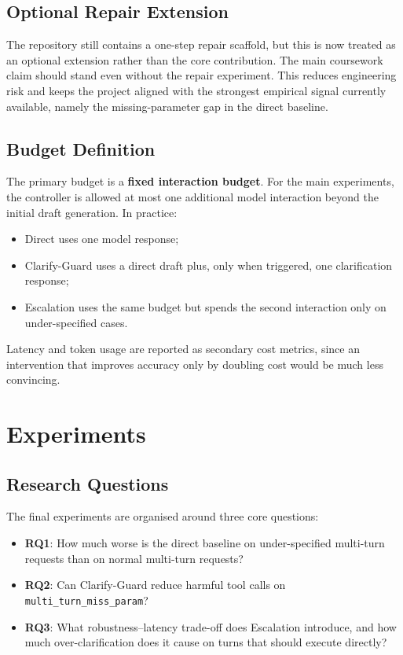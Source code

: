 \documentclass[10pt,twocolumn]{article}
\begin{document}
\subsection{Optional Repair Extension}
The repository still contains a one-step repair scaffold, but this is now treated as an optional extension rather than the core contribution. The main coursework claim should stand even without the repair experiment. This reduces engineering risk and keeps the project aligned with the strongest empirical signal currently available, namely the missing-parameter gap in the direct baseline.

\subsection{Budget Definition}
The primary budget is a \textbf{fixed interaction budget}. For the main experiments, the controller is allowed at most one additional model interaction beyond the initial draft generation. In practice:
\begin{itemize}
    \item Direct uses one model response;
    \item Clarify-Guard uses a direct draft plus, only when triggered, one clarification response;
    \item Escalation uses the same budget but spends the second interaction only on under-specified cases.
\end{itemize}

Latency and token usage are reported as secondary cost metrics, since an intervention that improves accuracy only by doubling cost would be much less convincing.

\section{Experiments}
\subsection{Research Questions}
The final experiments are organised around three core questions:
\begin{itemize}
    \item \textbf{RQ1}: How much worse is the direct baseline on under-specified multi-turn requests than on normal multi-turn requests?
    \item \textbf{RQ2}: Can Clarify-Guard reduce harmful tool calls on \texttt{multi\_turn\_miss\_param}?
    \item \textbf{RQ3}: What robustness--latency trade-off does Escalation introduce, and how much over-clarification does it cause on turns that should execute directly?
\end{itemize}
\end{document}
